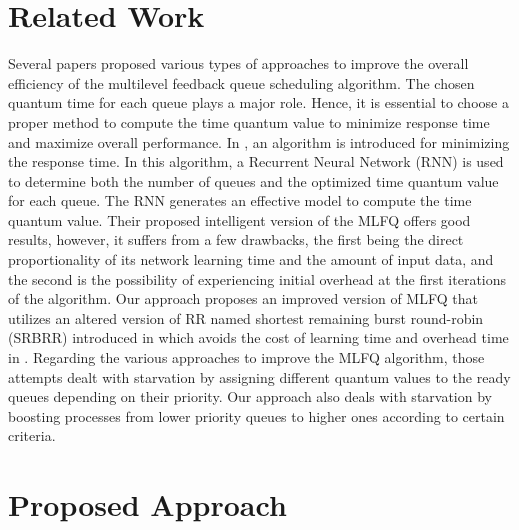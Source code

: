 \documentclass[conference]{IEEEtran}
\begin{document}
\section{Related Work}

Several papers proposed various types of approaches to improve the overall efficiency of the multilevel feedback queue scheduling algorithm. The chosen quantum time for each queue plays a major role. Hence, it is essential to choose a proper method to compute the time quantum value to minimize response time and maximize overall performance. In \cite{b2}, an algorithm is introduced for minimizing the response time. In this algorithm, a Recurrent Neural Network (RNN) is used to determine both the number of queues and the optimized time quantum value for each queue. The RNN generates an effective model to compute the time quantum value. Their proposed intelligent version of the MLFQ offers good results, however, it suffers from a few drawbacks, the first being the direct proportionality of its network learning time and the amount of input data, and the second is the possibility of experiencing initial overhead at the first iterations of the algorithm. Our approach proposes an improved version of MLFQ that utilizes an altered version of RR named shortest remaining burst round-robin (SRBRR) introduced in \cite{b3} which avoids the cost of learning time and overhead time in \cite{b2}. Regarding the various approaches to improve the MLFQ algorithm, those attempts dealt with starvation by assigning different quantum values to the ready queues depending on their priority. Our approach also deals with starvation by boosting processes from lower priority queues to higher ones according to certain criteria.


\section{Proposed Approach}
\end{document}
